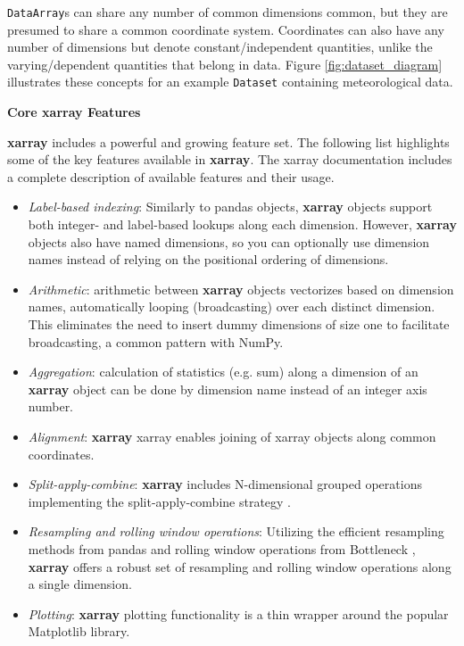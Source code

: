 \documentclass{jors}
\begin{document}
\verb|DataArray|s can share any number of common dimensions common, but they are presumed to share a common coordinate system.
Coordinates can also have any number of dimensions but denote constant/independent quantities, unlike the varying/dependent quantities that belong in data.
Figure \ref{fig:dataset_diagram} illustrates these concepts for an example \verb|Dataset| containing meteorological data.

\textbf{Core xarray Features}

\textbf{xarray} includes a powerful and growing feature set.
The following list highlights some of the key features available in \textbf{xarray}.
The xarray documentation \citep{xarray_docs} includes a complete description of available features and their usage.

\begin{itemize}
	\item \textit{Label-based indexing}: Similarly to pandas objects, \textbf{xarray} objects support both integer- and label-based lookups along each dimension.
	However, \textbf{xarray} objects also have named dimensions, so you can optionally use dimension names instead of relying on the positional ordering of dimensions.
	\item \textit{Arithmetic}: arithmetic between \textbf{xarray} objects vectorizes based on dimension names, automatically looping (broadcasting) over each distinct dimension. This eliminates the need to insert dummy dimensions of size one to facilitate broadcasting, a common pattern with NumPy.
	\item \textit{Aggregation}: calculation of statistics (e.g. sum) along a dimension of an \textbf{xarray} object can be done by dimension name instead of an integer axis number.
	\item \textit{Alignment}: \textbf{xarray} xarray enables joining of xarray objects along common coordinates.
	\item \textit{Split-apply-combine}: \textbf{xarray} includes N-dimensional grouped operations implementing the split-apply-combine strategy \citep{wickham_2011}.
	\item \textit{Resampling and rolling window operations}: Utilizing the efficient resampling methods from pandas and rolling window operations from Bottleneck \citep{Bottleneck}, \textbf{xarray} offers a robust set of resampling and rolling window operations along a single dimension.
	\item \textit{Plotting}: \textbf{xarray} plotting functionality is a thin wrapper around the popular Matplotlib library.

\end{itemize}
\end{document}
